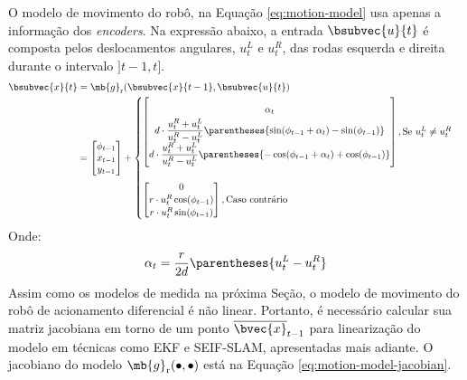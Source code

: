O modelo de movimento do robô, na Equação \ref{eq:motion-model} usa apenas a informação dos \textit{encoders}. Na 
expressão abaixo, a entrada 
$\bsubvec{u}{t}$ é composta pelos deslocamentos angulares, $u_t^L$ e $u_t^R$, das rodas esquerda e direita durante o intervalo $]t-1, t]$.
\newcommand{\factor}{d\cdot\dfrac{u_t^{R} + u_t^L}{u_t^R - u_t^L}}
\begin{equation}
\begin{aligned}
  \bsubvec{x}{t} &= \mb{g}_\mathrm{r}(\bsubvec{x}{t-1}, \bsubvec{u}{t}) \\
  &= \begin{bmatrix}
      \phi_{t-1}  \\ x_{t-1} \\ y_{t-1}
    \end{bmatrix} + 
  \begin{cases}
  \renewcommand{\arraystretch}{1.8}
    \begin{bmatrix}
      \alpha_t
      \\
      \factor \parentheses{\sin(\phi_{t-1} + \alpha_t) - \sin(\phi_{t-1})} 
      \\
      \factor \parentheses{-\cos(\phi_{t-1} + \alpha_t) + \cos(\phi_{t-1})}
    \end{bmatrix}, \text{Se } u_t^L \neq u_t^R \\ 
    \\
    \renewcommand{\arraystretch}{1.1}
    \begin{bmatrix}
      0
      \\
      r\cdot u_t^R \cos(\phi_{t-1}) 
      \\
      r\cdot u_t^R \sin(\phi_{t-1}) 
    \end{bmatrix}, \text{Caso contrário}
  \end{cases}
\end{aligned}
\label{eq:motion-model}
\end{equation}
\renewcommand{\arraystretch}{1}
Onde:
\begin{equation}
  \alpha_t = \dfrac{r}{2d} \parentheses{u_t^L - u_t^R}
\end{equation}
Assim como os modelos de medida na próxima Seção, o modelo de movimento do 
robô de acionamento diferencial é não linear. Portanto, é necessário calcular 
sua matriz jacobiana em torno de um ponto $\overline{\bvec{x}}_{t-1}$ para linearização do modelo em técnicas como EKF e SEIF-SLAM, apresentadas 
mais adiante. O jacobiano do modelo $\mb{g}_\mathrm{r}(\bullet, \bullet)$ está na Equação 
\ref{eq:motion-model-jacobian}.
